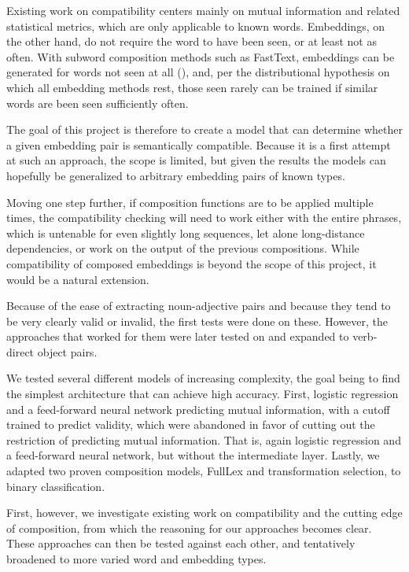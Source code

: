 \documentclass[a4paper, 12pt]{article}
\begin{document}
Existing work on compatibility centers mainly on mutual information and related statistical metrics, which are only applicable to known words. Embeddings, on the other hand, do not require the word to have been seen, or at least not as often. With subword composition methods such as FastText, embeddings can be generated for words not seen at all (\cite{FastText}), and, per the distributional hypothesis on which all embedding methods rest, those seen rarely can be trained if similar words are been seen sufficiently often.

The goal of this project is therefore to create a model that can determine whether a given embedding pair is semantically compatible. Because it is a first attempt at such an approach, the scope is limited, but given the results the models can hopefully be generalized to arbitrary embedding pairs of known types.

Moving one step further, if composition functions are to be applied multiple times, the compatibility checking will need to work either with the entire phrases, which is untenable for even slightly long sequences, let alone long-distance dependencies, or work on the output of the previous compositions. While compatibility of composed embeddings is beyond the scope of this project, it would be a natural extension.

Because of the ease of extracting noun-adjective pairs and because they tend to be very clearly valid or invalid, the first tests were done on these. However, the approaches that worked for them were later tested on and expanded to verb-direct object pairs.

We tested several different models of increasing complexity, the goal being to find the simplest architecture that can achieve high accuracy. First, logistic regression and a feed-forward neural network predicting mutual information, with a cutoff trained to predict validity, which were abandoned in favor of cutting out the restriction of predicting mutual information. That is, again logistic regression and a feed-forward neural network, but without the intermediate layer. Lastly, we adapted two proven composition models, FullLex and transformation selection, to binary classification.

First, however, we investigate existing work on compatibility and the cutting edge of composition, from which the reasoning for our approaches becomes clear. These approaches can then be tested against each other, and tentatively broadened to more varied word and embedding types.
\end{document}
